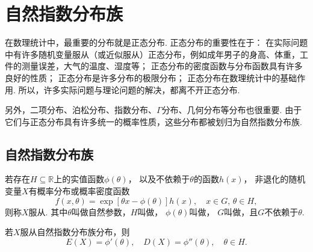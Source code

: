 \chapter{自然指数分布族}

在数理统计中，最重要的分布就是正态分布.
正态分布的重要性在于：
在实际问题中有许多随机变量服从（或近似服从）正态分布，例如成年男子的身高、体重，工件的测量误差，大气的温度、湿度等；
正态分布的密度函数与分布函数具有许多良好的性质；
正态分布是许多分布的极限分布；
正态分布在数理统计中的基础作用.
所以，许多实际问题与理论问题的解决，都离不开正态分布.

另外，二项分布、泊松分布、指数分布、\(\Gamma\)分布、几何分布等分布也很重要.
由于它们与正态分布具有许多统一的概率性质，这些分布都被划归为自然指数分布族.

\section{自然指数分布族}
\begin{definition}
若存在\(H \subseteq \mathbb{R}\)上的实值函数\(\phi(\theta)\)，
以及不依赖于\(\theta\)的函数\(h(x)\)，
非退化的随机变量\(X\)有概率分布或概率密度函数\begin{equation*}
f(x,\theta) = \exp[\theta x - \phi(\theta)] h(x),
\quad x \in G,\,\theta \in H,
\end{equation*}则称\(X\)服从.
其中\(\theta\)叫做自然参数，\(H\)叫做，
\(\phi(\theta)\)叫做，
\(G\)叫做，且\(G\)不依赖于\(\theta\).
\end{definition}

\begin{theorem}
若\(X\)服从自然指数分布族分布，则\begin{equation*}
E(X) = \phi'(\theta),
\quad
D(X) = \phi''(\theta),
\quad
\theta \in H.
\end{equation*}
\end{theorem}

